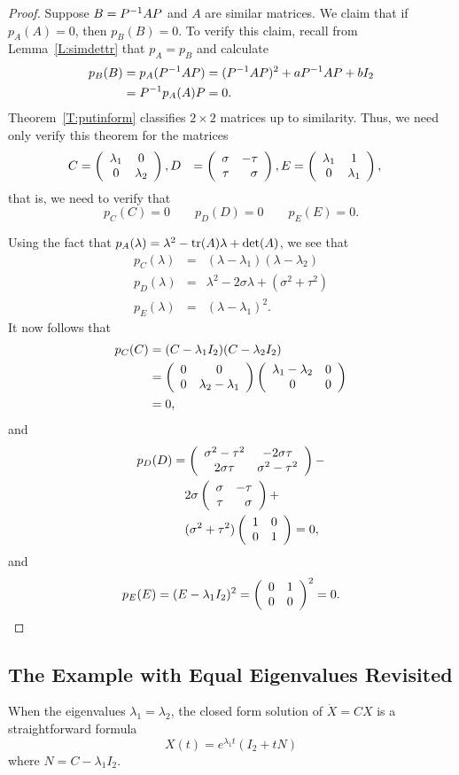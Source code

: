 \documentclass{ximera}
\begin{document}
\begin{proof}  Suppose $B=P^{-1} AP$ and $A$ are similar matrices.  We claim that
if $p_A(A)=0$, then $p_B(B)=0$.  To verify this claim, recall from
Lemma~\ref{L:simdettr} that $p_A=p_B$ and calculate
\begin{align*}
  p_B(B) &= p_A(P^{-1} AP) = (P^{-1} AP)^2 + aP^{-1} AP + bI_2 \\
  &= P^{-1} p_A(A)P= 0.
\end{align*}
Theorem~\ref{T:putinform} classifies $2\times 2$ matrices up to similarity.
Thus, we need only verify this theorem for the matrices
\begin{align*}
C &=  \left(\begin{array}{cc} \lambda_1 & 0\\ 0 &\lambda_2\end{array}\right),
D &=  \left(\begin{array}{rr} \sigma & -\tau\\ \tau &\sigma\end{array}\right),
E &=  \left(\begin{array}{cc} \lambda_1 & 1\\ 0 &\lambda_1\end{array}\right),
\end{align*}
that is, we need to verify that
\[
p_C(C) = 0 \qquad p_D(D)=0 \qquad p_E(E)=0.
\]

Using the fact that $p_A(\lambda)=\lambda^2-{\rm tr}(A)\lambda+\det(A)$, we see
that
\begin{eqnarray*}
p_C(\lambda) & = & (\lambda-\lambda_1)(\lambda-\lambda_2) \\
p_D(\lambda) & = & \lambda^2 - 2\sigma \lambda + (\sigma^2+\tau^2) \\
p_E(\lambda) & = & (\lambda-\lambda_1)^2.
\end{eqnarray*}
It now follows that
\begin{align*}
  p_C(C) &= (C-\lambda_1I_2)(C-\lambda_2I_2) 
           \\
&=\left(\begin{array}{cc} 0 & 0\\ 0 &\lambda_2-\lambda_1\end{array}\right)\left(\begin{array}{cc} \lambda_1-\lambda_2 & 0\\ 0 &0\end{array}\right) \\
&=0,
\end{align*}
and
\begin{align*}
p_D(D) &=
\left(\begin{array}{cc} \sigma^2-\tau^2 & -2\sigma\tau\\ 2\sigma\tau &\sigma^2-\tau^2\end{array}\right) -\\
       &\quad 2\sigma \left(\begin{array}{rr} \sigma & -\tau\\ \tau &\sigma\end{array}\right) + \\
  &\quad (\sigma^2+\tau^2)\left(\begin{array}{rr} 1 & 0\\ 0 &1\end{array}\right) = 0,
\end{align*}
and
\[
p_E(E) = (E-\lambda_1I_2)^2 = \left(\begin{array}{rr} 0 & 1\\ 0 &0\end{array}\right)^2 = 0.
\]
\end{proof}


\subsection*{The Example with Equal Eigenvalues Revisited}

When the eigenvalues $\lambda_1=\lambda_2$, the closed form solution of 
$\dot{X} = CX$ is a straightforward formula
\begin{equation}  \label{E:exeq}
X(t) = e^{\lambda_1 t}(I_2 + tN)
\end{equation}
where $N = C - \lambda_1I_2$.
\end{document}
